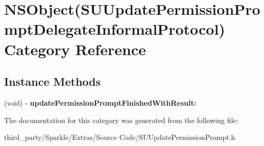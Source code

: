\hypertarget{category_n_s_object_07_s_u_update_permission_prompt_delegate_informal_protocol_08}{}\section{N\+S\+Object(S\+U\+Update\+Permission\+Prompt\+Delegate\+Informal\+Protocol) Category Reference}
\label{category_n_s_object_07_s_u_update_permission_prompt_delegate_informal_protocol_08}
\subsection*{Instance Methods}
\begin{DoxyCompactItemize}
\item 
\mbox{\label{category_n_s_object_07_s_u_update_permission_prompt_delegate_informal_protocol_08_a24b9cc2ce030db6159cb8d6ce2737813}} 
(void) -\/ {\bfseries update\+Permission\+Prompt\+Finished\+With\+Result\+:}
\end{DoxyCompactItemize}


The documentation for this category was generated from the following file\+:\begin{DoxyCompactItemize}
\item 
third\+\_\+party/\+Sparkle/\+Extras/\+Source Code/S\+U\+Update\+Permission\+Prompt.\+h\end{DoxyCompactItemize}
